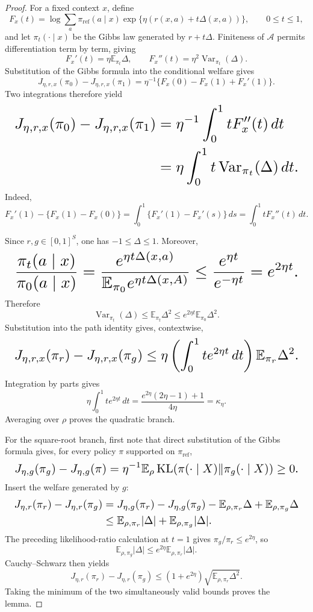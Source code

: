 \documentclass{article}
\begin{document}
\begin{proof}
For a fixed context \(x\), define
\[
F_x(t)=\log\sum_a\pi_{\mathrm{ref}}(a\mid x)
\exp\{\eta(r(x,a)+t\Delta(x,a))\},
\qquad 0\le t\le1,
\]
and let \(\pi_t(\cdot\mid x)\) be the Gibbs law generated by \(r+t\Delta\). Finiteness of \(\mathcal A\) permits differentiation term by term, giving
\[
F_x'(t)=\eta\mathbb E_{\pi_t}\Delta,
\qquad
F_x''(t)=\eta^2\operatorname{Var}_{\pi_t}(\Delta).
\]
Substitution of the Gibbs formula into the conditional welfare gives
\[
J_{\eta,r,x}(\pi_0)-J_{\eta,r,x}(\pi_1)
=\eta^{-1}\{F_x(0)-F_x(1)+F_x'(1)\}.
\]
Two integrations therefore yield
\[
\makebox[\linewidth][c]{\resizebox{0.98\linewidth}{!}{\(\displaystyle \begin{aligned}
J_{\eta,r,x}(\pi_0)-J_{\eta,r,x}(\pi_1)
&=\eta^{-1}\int_0^1tF_x''(t)\,dt\\
&=\eta\int_0^1t\operatorname{Var}_{\pi_t}(\Delta)\,dt.
\end{aligned}\)}}
\]
Indeed,
\[
F_x'(1)-\{F_x(1)-F_x(0)\}
=\int_0^1\{F_x'(1)-F_x'(s)\}\,ds
=\int_0^1tF_x''(t)\,dt.
\]

Since \(r,g\in[0,1]^S\), one has \(-1\le\Delta\le1\). Moreover,
\[
\makebox[\linewidth][c]{\resizebox{0.98\linewidth}{!}{\(\displaystyle \frac{\pi_t(a\mid x)}{\pi_0(a\mid x)}
=\frac{e^{\eta t\Delta(x,a)}}{\mathbb E_{\pi_0}e^{\eta t\Delta(x,A)}}
\le\frac{e^{\eta t}}{e^{-\eta t}}
=e^{2\eta t}.\)}}
\]
Therefore
\[
\operatorname{Var}_{\pi_t}(\Delta)
\le\mathbb E_{\pi_t}\Delta^2
\le e^{2\eta t}\mathbb E_{\pi_0}\Delta^2.
\]
Substitution into the path identity gives, contextwise,
\[
\makebox[\linewidth][c]{\resizebox{0.98\linewidth}{!}{\(\displaystyle J_{\eta,r,x}(\pi_r)-J_{\eta,r,x}(\pi_g)
\le\eta\left(\int_0^1t e^{2\eta t}\,dt\right)
\mathbb E_{\pi_r}\Delta^2.\)}}
\]
Integration by parts gives
\[
\eta\int_0^1t e^{2\eta t}\,dt
=\frac{e^{2\eta}(2\eta-1)+1}{4\eta}
=\kappa_\eta.
\]
Averaging over \(\rho\) proves the quadratic branch.

For the square-root branch, first note that direct substitution of the Gibbs formula gives, for every policy \(\pi\) supported on \(\pi_{\mathrm{ref}}\),
\[
\makebox[\linewidth][c]{\resizebox{0.98\linewidth}{!}{\(\displaystyle J_{\eta,g}(\pi_g)-J_{\eta,g}(\pi)
=\eta^{-1}\mathbb E_\rho\operatorname{KL}(\pi(\cdot\mid X)\Vert\pi_g(\cdot\mid X))\ge0.\)}}
\]
Insert the welfare generated by \(g\):
\[
\makebox[\linewidth][c]{\resizebox{0.98\linewidth}{!}{\(\displaystyle \begin{aligned}
J_{\eta,r}(\pi_r)-J_{\eta,r}(\pi_g)
&=J_{\eta,g}(\pi_r)-J_{\eta,g}(\pi_g)
   -\mathbb E_{\rho,\pi_r}\Delta
   +\mathbb E_{\rho,\pi_g}\Delta\\
&\le\mathbb E_{\rho,\pi_r}|\Delta|
   +\mathbb E_{\rho,\pi_g}|\Delta|.
\end{aligned}\)}}
\]
The preceding likelihood-ratio calculation at \(t=1\) gives \(\pi_g/\pi_r\le e^{2\eta}\), so
\[
\mathbb E_{\rho,\pi_g}|\Delta|
\le e^{2\eta}\mathbb E_{\rho,\pi_r}|\Delta|.
\]
Cauchy--Schwarz then yields
\[
J_{\eta,r}(\pi_r)-J_{\eta,r}(\pi_g)
\le(1+e^{2\eta})
\sqrt{\mathbb E_{\rho,\pi_r}\Delta^2}.
\]
Taking the minimum of the two simultaneously valid bounds proves the lemma.
\end{proof}
\end{document}
